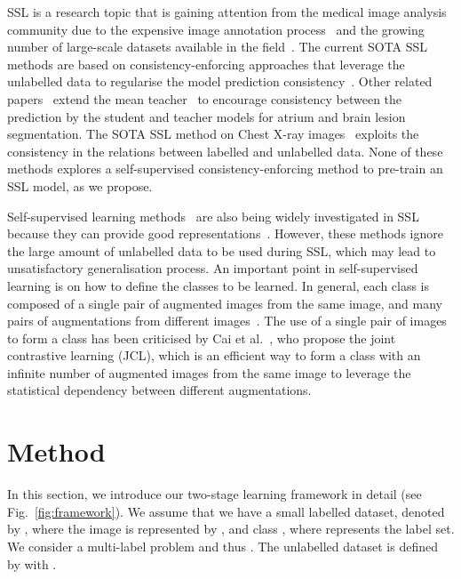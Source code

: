 \documentclass[runningheads]{llncs}
\begin{document}
SSL is a research topic that is gaining attention from the medical image analysis community due to the expensive image annotation process~\cite{cheplygina2019not} and the growing number of large-scale datasets available in the field~\cite{wang2017chestx}. 
The current SOTA SSL methods are based on consistency-enforcing approaches that leverage the unlabelled data to regularise the model prediction consistency~\cite{tarvainen2017mean,laine2016temporal}. 
 Other related papers~\cite{cui2019semi} extend the mean teacher~\cite{tarvainen2017mean} to encourage consistency between the prediction by the student and teacher models for atrium and brain lesion segmentation. 
The SOTA SSL method on Chest X-ray images~\cite{liu2020semi} exploits the consistency in the relations between labelled and unlabelled data. 
None of these methods explores a self-supervised consistency-enforcing  method to pre-train an SSL model, as we propose.

Self-supervised learning methods~\cite{simclr,moco} are also being widely investigated in SSL because they can provide good representations~\cite{chen2020big,zhai2019s4l}. However, these methods ignore the large amount of unlabelled data to be used during SSL, which may lead to unsatisfactory generalisation process. An important point in self-supervised learning is on how to define the classes to be learned.
In general, each class is composed of a single pair of augmented images from the same image, and many pairs of augmentations from different images~\cite{moco,simclr,cai2020joint,chen2020big}.
The use of a single pair of images to form a class has been criticised by Cai et al.~\cite{cai2020joint}, who propose the joint contrastive learning (JCL), which is an efficient way to form a class with an infinite number of augmented images from the same image to leverage the statistical dependency between different augmentations.  









\section{Method}




In this section, we introduce our two-stage learning framework in detail (see Fig.~\ref{fig:framework}). 
We assume that we have a small labelled dataset, denoted by , where the image is represented by , and class 
, where  represents the label set.
We consider a multi-label problem and thus . The unlabelled dataset is defined by  with .
\end{document}
